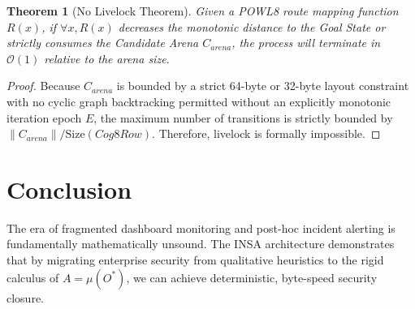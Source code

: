 \documentclass[11pt,twoside,a4paper]{book}
\newtheorem{theorem}{Theorem}[chapter]
\begin{document}
\begin{theorem}[No Livelock Theorem]
Given a POWL8 route mapping function $R(x)$, if $\forall x, R(x)$ decreases the monotonic distance to the Goal State or strictly consumes the Candidate Arena $C_{arena}$, the process will terminate in $\mathcal{O}(1)$ relative to the arena size.
\end{theorem}
\begin{proof}
Because $C_{arena}$ is bounded by a strict 64-byte or 32-byte layout constraint with no cyclic graph backtracking permitted without an explicitly monotonic iteration epoch $E$, the maximum number of transitions is strictly bounded by $\|C_{arena}\| / \text{Size}(Cog8Row)$. Therefore, livelock is formally impossible.
\end{proof}

\chapter{Conclusion}
The era of fragmented dashboard monitoring and post-hoc incident alerting is fundamentally mathematically unsound. The INSA architecture demonstrates that by migrating enterprise security from qualitative heuristics to the rigid calculus of $A = \mu(O^*)$, we can achieve deterministic, byte-speed security closure.
\end{document}

